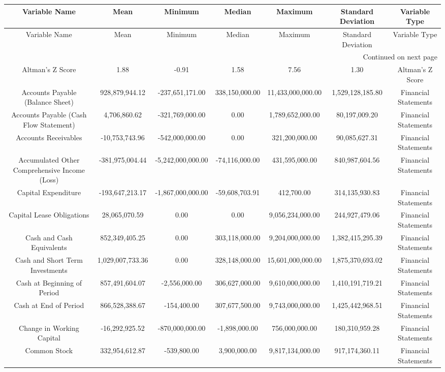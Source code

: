 \tiny
\begin{longtable}{ccccccc}
\toprule
Variable Name & Mean & Minimum & Median & Maximum & Standard Deviation & Variable Type \\
\midrule
\endfirsthead
\toprule
Variable Name & Mean & Minimum & Median & Maximum & Standard Deviation & Variable Type \\
\midrule
\endhead
\midrule
\multicolumn{7}{r}{Continued on next page} \\
\midrule
\endfoot
\bottomrule
\endlastfoot
Altman's Z Score & 1.88 & -0.91 & 1.58 & 7.56 & 1.30 & Altman's Z Score \\
Accounts Payable (Balance Sheet) & 928,879,944.12 & -237,651,171.00 & 338,150,000.00 & 11,433,000,000.00 & 1,529,128,185.80 & Financial Statements \\
Accounts Payable (Cash Flow Statement) & 4,706,860.62 & -321,769,000.00 & 0.00 & 1,789,652,000.00 & 80,197,009.20 & Financial Statements \\
Accounts Receivables & -10,753,743.96 & -542,000,000.00 & 0.00 & 321,200,000.00 & 90,085,627.31 & Financial Statements \\
Accumulated Other Comprehensive Income (Loss) & -381,975,004.44 & -5,242,000,000.00 & -74,116,000.00 & 431,595,000.00 & 840,987,604.56 & Financial Statements \\
Capital Expenditure & -193,647,213.17 & -1,867,000,000.00 & -59,608,703.91 & 412,700.00 & 314,135,930.83 & Financial Statements \\
Capital Lease Obligations & 28,065,070.59 & 0.00 & 0.00 & 9,056,234,000.00 & 244,927,479.06 & Financial Statements \\
Cash and Cash Equivalents & 852,349,405.25 & 0.00 & 303,118,000.00 & 9,204,000,000.00 & 1,382,415,295.39 & Financial Statements \\
Cash and Short Term Investments & 1,029,007,733.36 & 0.00 & 328,148,000.00 & 15,601,000,000.00 & 1,875,370,693.02 & Financial Statements \\
Cash at Beginning of Period & 857,491,604.07 & -2,556,000.00 & 306,627,000.00 & 9,610,000,000.00 & 1,410,191,719.21 & Financial Statements \\
Cash at End of Period & 866,528,388.67 & -154,400.00 & 307,677,500.00 & 9,743,000,000.00 & 1,425,442,968.51 & Financial Statements \\
Change in Working Capital & -16,292,925.52 & -870,000,000.00 & -1,898,000.00 & 756,000,000.00 & 180,310,959.28 & Financial Statements \\
Common Stock & 332,954,612.87 & -539,800.00 & 3,900,000.00 & 9,817,134,000.00 & 917,174,360.11 & Financial Statements \\

\end{longtable}
